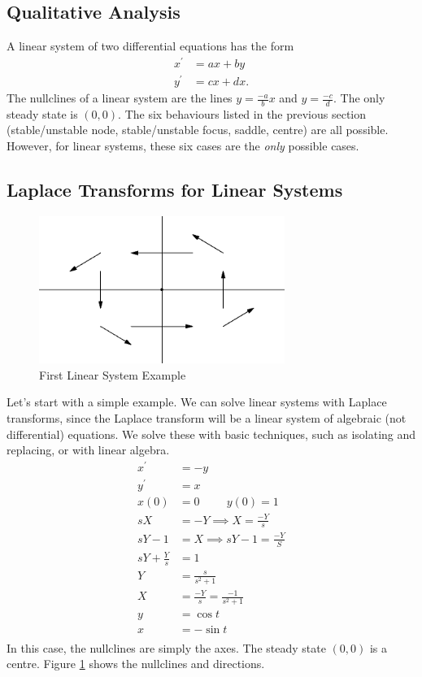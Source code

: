 \documentclass[fleqn,letterpaper]{report}
\begin{document}
\subsection{Qualitative Analysis}
\label{qualitative-analysis}

A linear system of two differential equations has the form 
\begin{align*}
x^\prime & = ax + by \\
y^\prime & = cx + dx. 
\end{align*}
The nullclines of a linear system are the lines $y =
\frac{-a}{b} x$ and $y = \frac{-c}{d} $. The only steady
state is $(0,0)$. The six behaviours listed in the previous
section (stable/unstable node, stable/unstable focus, saddle,
centre) are all possible. However, for linear systems,
these six cases are the \emph{only} possible cases. 

\subsection{Laplace Transforms for Linear Systems}
\label{laplace-linear-systems}

\begin{figure}[t]
\centering
\includegraphics[width=8cm]{figure39.eps}
\caption{First Linear System Example}
\label{figure-linear-system1}
\end{figure}

\begin{example}
Let's start with a simple example. We can solve linear
systems with Laplace transforms, since the Laplace transform
will be a linear system of algebraic (not differential)
equations. We solve these with basic techniques, such as
isolating and replacing, or with linear algebra.
\begin{align*}
x^\prime & = -y \\
y^\prime & = x \\
x(0) & = 0 \hspace{1cm} y(0) = 1 \\
sX & = -Y \implies X = \frac{-Y}{s}\\
sY -1 & = X \implies sY - 1 = \frac{-Y}{S} \\
sY + \frac{Y}{s} & = 1 \\
Y & = \frac{s}{s^2+1} \\
X & = \frac{-Y}{s} = \frac{-1}{s^2+1} \\
y & = \cos t \\
x & = - \sin t \\
\end{align*}
In this case, the nullclines are simply the axes. The steady
state $(0,0)$ is a centre. Figure \ref{figure-linear-system1}
shows the nullclines and directions.
\end{example}
\end{document}
